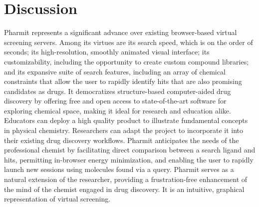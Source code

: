 \section{Discussion}
Pharmit represents a significant advance over existing browser-based virtual screening servers. Among its virtues are its search speed, which is on the order of seconds; its high-resolution, smoothly animated visual interface; its customizability, including the opportunity to create custom compound libraries; and its expansive suite of search features, including an array of chemical constraints that allow the user to rapidly identify hits that are also promising candidates as drugs. It democratizes structure-based computer-aided drug discovery by offering free and open access to state-of-the-art software for exploring chemical space, making it ideal for research and education alike. Educators can deploy a high quality product to illustrate fundamental concepts in physical chemistry. Researchers can adapt the project to incorporate it into their existing drug discovery workflows. Pharmit anticipates the needs of the professional chemist by facilitating direct comparison between a search ligand and hits, permitting in-browser energy minimization, and enabling the user to rapidly launch new sessions using molecules found via a query. Pharmit serves as a natural extension of the researcher, providing a frustration-free enhancement of the mind of the chemist engaged in drug discovery. It is an intuitive, graphical representation of virtual screening. 

